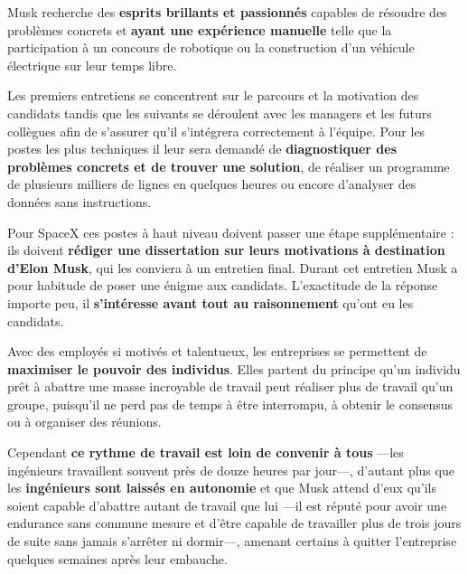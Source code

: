 Musk recherche des\textbf{ esprits brillants et passionnés} capables de résoudre des problèmes concrets et \textbf{ayant une expérience manuelle} telle que la participation à un concours de robotique ou la construction d'un véhicule électrique sur leur temps libre.

Les premiers entretiens se concentrent sur le parcours et la motivation des candidats tandis que les suivants se déroulent avec les managers et les futurs collègues afin de s'assurer qu'il s'intégrera correctement à l'équipe. Pour les postes les plus techniques il leur sera demandé de \textbf{diagnostiquer des problèmes concrets et de trouver une solution}, de réaliser un programme de plusieurs milliers de lignes en quelques heures ou encore d'analyser des données sans instructions.

Pour SpaceX ces postes à haut niveau doivent passer une étape supplémentaire : ils doivent \textbf{rédiger une dissertation sur leurs motivations à destination d'Elon Musk}, qui les conviera à un entretien final. Durant cet entretien Musk a pour habitude de poser une énigme aux candidats. L'exactitude de la réponse importe peu, il \textbf{s'intéresse avant tout au raisonnement} qu'ont eu les candidats.

\vspace{5mm}

Avec des employés si motivés et talentueux, les entreprises se permettent de \textbf{maximiser le pouvoir des individus}. Elles partent du principe qu'un individu prêt à abattre une masse incroyable de travail peut réaliser plus de travail qu'un groupe, puisqu'il ne perd pas de temps à être interrompu, à obtenir le consensus ou à organiser des réunions.

Cependant \textbf{ce rythme de travail est loin de convenir à tous} ---les ingénieurs travaillent souvent près de douze heures par jour---, d'autant plus que les \textbf{ingénieurs sont laissés en autonomie} et que Musk attend d'eux qu'ils soient capable d'abattre autant de travail que lui ---il est réputé pour avoir une endurance sans commune mesure et d'être capable de travailler plus de trois jours de suite sans jamais s'arrêter ni dormir---, amenant certains à quitter l'entreprise quelques semaines après leur embauche. 